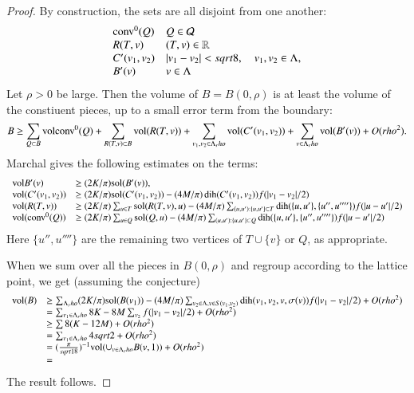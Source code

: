 \begin{proof}
By construction, the sets are all disjoint from one another:
$$\begin{array}{lll}
  {\operatorname{conv}}^0(Q) & Q\in {\mathcal Q}\\
  R(T,v) & (T,v)\in {\mathbb R}\\
  C'(v_1,v_2) & |v_1-v_2|<sqrt8,\quad v_1,v_2\in\Lambda,\\
  B'(v) & v\in \Lambda
\end{array}
$$
Let $\rho>0$ be large.  Then the volume of $B=B(0,\rho)$ is at least
the volume of the constiuent pieces, up to a small error term from the boundary:
$$B \ge \sum_{Q\subset B}{\operatorname{vol}}{\operatorname{conv}}^0(Q) +
  \sum_{R(T,v)\subset B}{\operatorname{vol}}(R(T,v)) +
  \sum_{v_1,v_2\in \Lambda_rho}{\operatorname{vol}}(C'(v_1,v_2)) +
   \sum_{v\in \Lambda_rho} {\operatorname{vol}}(B'(v)) + O(rho^2).
$$
Marchal gives the following estimates on the terms:
$$
\begin{array}{lll}
{\operatorname{vol}}B'(v) &\ge (2K/\pi){\operatorname{sol}}(B'(v)), \\
{\operatorname{vol}}(C'(v_1,v_2)) &\ge (2K/\pi){\operatorname{sol}}(C'(v_1,v_2)) - (4 M/\pi) \operatorname{dih}(C'(v_1,v_2)) f(|v_1-v_2|/2)\\
{\operatorname{vol}}(R(T,v)) &\ge (2K/\pi)\sum_{u\in T}{\operatorname{sol}}(R(T,v),u) - (4M/\pi)\sum_{(u,u'):\{u,u'\}\subset T}
\operatorname{dih}(\{u,u'\},\{u'',u''''\}) f(|u-u'|/2)\\
{\operatorname{vol}}({\operatorname{conv}}^0(Q)) &\ge (2K/\pi)\sum_{u\in Q}{\operatorname{sol}}(Q,u) - (4M/\pi)\sum_{(u,u'):\{u,u'\}\subset Q} 
\operatorname{dih}(\{u,u'\},\{u'',u''''\}) f(|u-u'|/2)\\
\end{array}
$$
Here $\{u'',u''''\}$ are the remaining two vertices of $T\cup\{v\}$ or $Q$, as appropriate.

When we sum over all the pieces in $B(0,\rho)$ and regroup according to the lattice point, we get
(assuming the conjecture)
$$
\begin{array}{lll}
{\operatorname{vol}}(B) &\ge \sum_{\Lambda_rho} (2K/\pi) {\operatorname{sol}}(B(v_1)) - (4 M/\pi) \sum_{v_2\in\Lambda,v\in S(v_1,v_2)}
\operatorname{dih}(v_1,v_2,v,\sigma(v)) f(|v_1-v_2|/2) + O(rho^2)\\
   &= \sum_{v_1\in\Lambda_rho} 8 K - 8 M\sum_{v_2} f(|v_1-v_2|/2) + O(rho^2)\\
   &\ge\sum 8 (K - 12 M) + O(rho^2)\\
   &= \sum_{v_1\in \Lambda_rho} 4 sqrt2 + O(rho^2)\\
   &= (\frac{\pi}{sqrt18})^{-1} {\operatorname{vol}}(\cup_{v\in\Lambda_rho}B(v,1))  + O(rho^2)\\
   &=
\end{array}
$$
The result follows.


 
\end{proof}